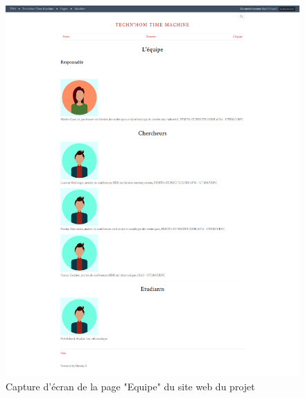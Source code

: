 \begin{figure} [H]
    \centering
    \includegraphics[width=1\textwidth]{assets/annexes/omeka_equipe.png}
    \caption{Capture d'écran de la page "Equipe" du site web du projet}
    \label{fig:pageEquipeOmeka}
\end{figure}
